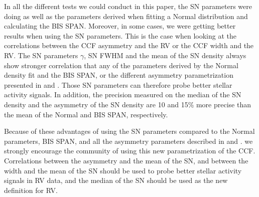 \documentclass{aa}
\begin{document}
In all the different tests we could conduct in this paper, the SN parameters were doing as well as the parameters derived when fitting a Normal distribution and calculating the BIS SPAN.
Moreover, in some cases, we were getting better results when using the SN parameters. This is the case when looking at the correlations between the CCF asymmetry and the RV or the CCF width and the RV. The SN parameters $\gamma$, SN FWHM and the mean of the SN density always show stronger correlation that any of the parameters derived by the Normal density fit and the BIS SPAN, or the different asymmetry parametrization presented in \citet{Boisse-2011} and \citet{Figueira-2013}. Those SN parameters can therefore probe better stellar activity signals. In addition, the precision measured on the median of the SN density and the asymmetry of the SN density are 10 and 15\% more precise than the mean of the Normal and BIS SPAN, respectively.

Because of these advantages of using the SN parameters compared to the Normal parameters, BIS SPAN, and all the asymmetry parameters described in \citet{Boisse-2011} and \citet{Figueira-2013}. we strongly encourage the community of using this new parametrization of the CCF.
Correlations between the asymmetry and the mean of the SN, and between the width and the mean of the SN should be used to probe better stellar activity signals in RV data, and the median of the SN should be used as the new definition for RV.



\end{document}
